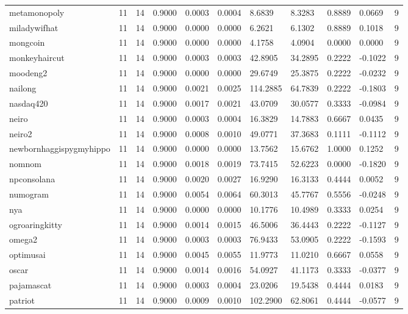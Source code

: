 \begin{table}[htbp]
\begin{tabular}{lllllllllll}
metamonopoly & 11 & 14 & 0.9000 & 0.0003 & 0.0004 & 8.6839 & 8.3283 & 0.8889 & 0.0669 & 9 \\
miladywifhat & 11 & 14 & 0.9000 & 0.0000 & 0.0000 & 6.2621 & 6.1302 & 0.8889 & 0.1018 & 9 \\
mongcoin & 11 & 14 & 0.9000 & 0.0000 & 0.0000 & 4.1758 & 4.0904 & 0.0000 & 0.0000 & 9 \\
monkeyhaircut & 11 & 14 & 0.9000 & 0.0003 & 0.0003 & 42.8905 & 34.2895 & 0.2222 & -0.1022 & 9 \\
moodeng2 & 11 & 14 & 0.9000 & 0.0000 & 0.0000 & 29.6749 & 25.3875 & 0.2222 & -0.0232 & 9 \\
nailong & 11 & 14 & 0.9000 & 0.0021 & 0.0025 & 114.2885 & 64.7839 & 0.2222 & -0.1803 & 9 \\
nasdaq420 & 11 & 14 & 0.9000 & 0.0017 & 0.0021 & 43.0709 & 30.0577 & 0.3333 & -0.0984 & 9 \\
neiro & 11 & 14 & 0.9000 & 0.0003 & 0.0004 & 16.3829 & 14.7883 & 0.6667 & 0.0435 & 9 \\
neiro2 & 11 & 14 & 0.9000 & 0.0008 & 0.0010 & 49.0771 & 37.3683 & 0.1111 & -0.1112 & 9 \\
newbornhaggispygmyhippo & 11 & 14 & 0.9000 & 0.0000 & 0.0000 & 13.7562 & 15.6762 & 1.0000 & 0.1252 & 9 \\
nomnom & 11 & 14 & 0.9000 & 0.0018 & 0.0019 & 73.7415 & 52.6223 & 0.0000 & -0.1820 & 9 \\
npconsolana & 11 & 14 & 0.9000 & 0.0020 & 0.0027 & 16.9290 & 16.3133 & 0.4444 & 0.0052 & 9 \\
numogram & 11 & 14 & 0.9000 & 0.0054 & 0.0064 & 60.3013 & 45.7767 & 0.5556 & -0.0248 & 9 \\
nya & 11 & 14 & 0.9000 & 0.0000 & 0.0000 & 10.1776 & 10.4989 & 0.3333 & 0.0254 & 9 \\
ogroaringkitty & 11 & 14 & 0.9000 & 0.0014 & 0.0015 & 46.5006 & 36.4443 & 0.2222 & -0.1127 & 9 \\
omega2 & 11 & 14 & 0.9000 & 0.0003 & 0.0003 & 76.9433 & 53.0905 & 0.2222 & -0.1593 & 9 \\
optimusai & 11 & 14 & 0.9000 & 0.0045 & 0.0055 & 11.9773 & 11.0210 & 0.6667 & 0.0558 & 9 \\
oscar & 11 & 14 & 0.9000 & 0.0014 & 0.0016 & 54.0927 & 41.1173 & 0.3333 & -0.0377 & 9 \\
pajamascat & 11 & 14 & 0.9000 & 0.0003 & 0.0004 & 23.0206 & 19.5438 & 0.4444 & 0.0183 & 9 \\
patriot & 11 & 14 & 0.9000 & 0.0009 & 0.0010 & 102.2900 & 62.8061 & 0.4444 & -0.0577 & 9 \\

\end{tabular}
\end{table}
